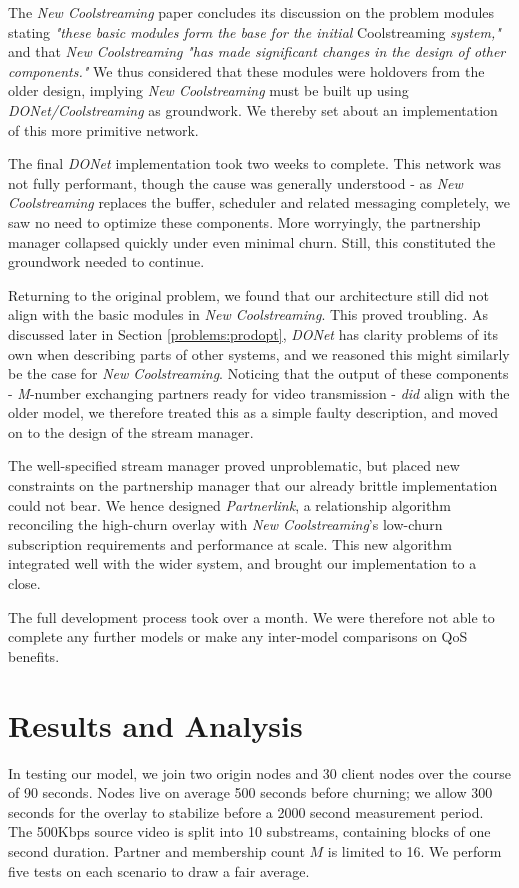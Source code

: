\documentclass[12pt,a4paper]{article}
\begin{document}
The \textit{New Coolstreaming} paper concludes its discussion on the problem modules stating \textit{"these basic modules form the base for the initial }Coolstreaming\textit{ system,"} and that \textit{New Coolstreaming} \textit{"has made significant changes in the design of other components."} We thus considered that these modules were holdovers from the older design, implying \textit{New Coolstreaming} must be built up using \textit{DONet/Coolstreaming} as groundwork. We thereby set about an implementation of this more primitive network.

The final \textit{DONet} implementation took two weeks to complete. This network was not fully performant, though the cause was generally understood - as \textit{New Coolstreaming} replaces the buffer, scheduler and related messaging completely, we saw no need to optimize these components. More worryingly, the partnership manager collapsed quickly under even minimal churn. Still, this constituted the groundwork needed to continue.

Returning to the original problem, we found that our architecture still did not align with the basic modules in \textit{New Coolstreaming}. This proved troubling. As discussed later in Section \ref{problems:prodopt}, \textit{DONet} has clarity problems of its own when describing parts of other systems, and we reasoned this might similarly be the case for \textit{New Coolstreaming}. Noticing that the output of these components - \textit{M}-number exchanging partners ready for video transmission - \textit{did} align with the older model, we therefore treated this as a simple faulty description, and moved on to the design of the stream manager.

The well-specified stream manager proved unproblematic, but placed new constraints on the partnership manager that our already brittle implementation could not bear. We hence designed \textit{Partnerlink}, a relationship algorithm reconciling the high-churn overlay with \textit{New Coolstreaming}'s low-churn subscription requirements and performance at scale. This new algorithm integrated well with the wider system, and brought our implementation to a close.

The full development process took over a month. We were therefore not able to complete any further models or make any inter-model comparisons on QoS benefits.

\section{Results and Analysis} \label{results}
In testing our model, we join two origin nodes and 30 client nodes over the course of 90 seconds. Nodes live on average 500 seconds before churning; we allow 300 seconds for the overlay to stabilize before a 2000 second measurement period. The 500Kbps source video is split into 10 substreams, containing blocks of one second duration. Partner and membership count \(M\) is limited to 16. We perform five tests on each scenario to draw a fair average.
\end{document}
